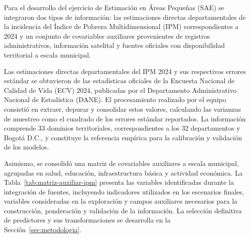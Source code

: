 
\label{sec:datos}

Para el desarrollo del ejercicio de Estimación en Áreas Pequeñas (SAE) se integraron dos tipos de información: las estimaciones directas departamentales de la incidencia del Índice de Pobreza Multidimensional (IPM) correspondientes a 2024 \cite{dane2024ecv} y un conjunto de covariables auxiliares provenientes de registros administrativos, información satelital y fuentes oficiales con disponibilidad territorial a escala municipal.

Las estimaciones directas departamentales del IPM 2024 y sus respectivos errores estándar se obtuvieron de las estadísticas oficiales de la Encuesta Nacional de Calidad de Vida (ECV) 2024, publicadas por el Departamento Administrativo Nacional de Estadística (DANE). El procesamiento realizado por el equipo consistió en extraer, depurar y consolidar estos valores, calculando las varianzas de muestreo como el cuadrado de los errores estándar reportados. La información comprende 33 dominios territoriales, correspondientes a los 32 departamentos y Bogotá D.C., y constituye la referencia empírica para la calibración y validación de los modelos.

Asimismo, se consolidó una matriz de covariables auxiliares a escala municipal, agrupadas en salud, educación, infraestructura básica y actividad económica. La Tabla~\ref{tab:matriz-auxiliar-ipm} presenta las variables identificadas durante la integración de fuentes, incluyendo indicadores utilizados en los escenarios finales, variables consideradas en la exploración y campos auxiliares necesarios para la construcción, ponderación y validación de la información. La selección definitiva de predictores y sus transformaciones se desarrolla en la Sección~\ref{sec:metodologia}.

\begingroup
\setlength{\tabcolsep}{3pt}
\renewcommand{\arraystretch}{1.15}
\footnotesize
\setlength{\LTleft}{0pt}  %

